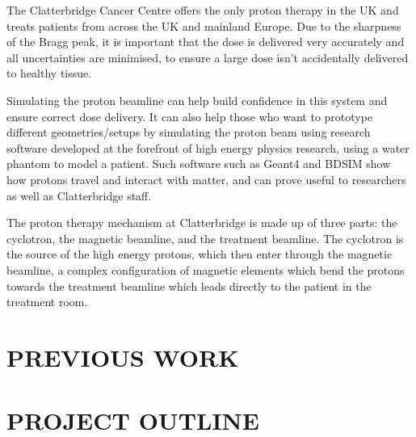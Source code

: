 \documentclass[a4paper, 12pt, conference]
{ieeeconf}      %
\begin{document}
The Clatterbridge Cancer Centre offers the only proton therapy in the UK and treats patients from across the UK and mainland Europe. Due to the sharpness of the Bragg peak, it is important that the dose is delivered very accurately and all uncertainties are minimised, to ensure a large dose isn't accidentally delivered to healthy tissue. 

Simulating the proton beamline can help build confidence in this system and ensure correct dose delivery. It can also help those who want to prototype different geometries/setups by simulating the proton beam using research software developed at the forefront of high energy physics research, using a water phantom to model a patient. Such software such as Geant4 and BDSIM show how protons travel and interact with matter, and can prove useful to researchers as well as Clatterbridge staff.


The proton therapy mechanism at Clatterbridge is made up of three parts: the cyclotron, the magnetic beamline, and the treatment beamline. The cyclotron is the source of the high energy protons, which then enter through the magnetic beamline, a complex configuration of magnetic elements which bend the protons towards the treatment beamline which leads directly to the patient in the treatment room.





\section{PREVIOUS WORK}








\section{PROJECT OUTLINE}


\newpage



\addtolength{\textheight}{-12cm}   %
\end{document}

